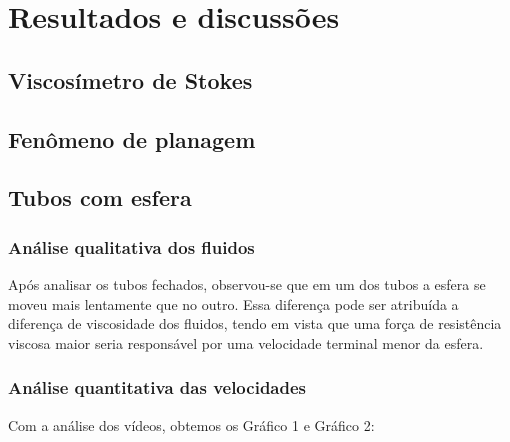 \section{Resultados e discussões}
\subsection{Viscosímetro de Stokes}

\subsection{Fenômeno de planagem}

\subsection{Tubos com esfera}
\subsubsection{Análise qualitativa dos fluidos}
    Após analisar os tubos fechados, observou-se que em um dos tubos a esfera se
    moveu mais lentamente que no outro. Essa diferença pode ser atribuída a
    diferença de viscosidade dos fluidos, tendo em vista que uma força de
    resistência viscosa maior seria responsável por uma velocidade terminal
    menor da esfera. 

\subsubsection{Análise quantitativa das velocidades}
    Com a análise dos vídeos, obtemos os Gráfico 1 e Gráfico 2:

